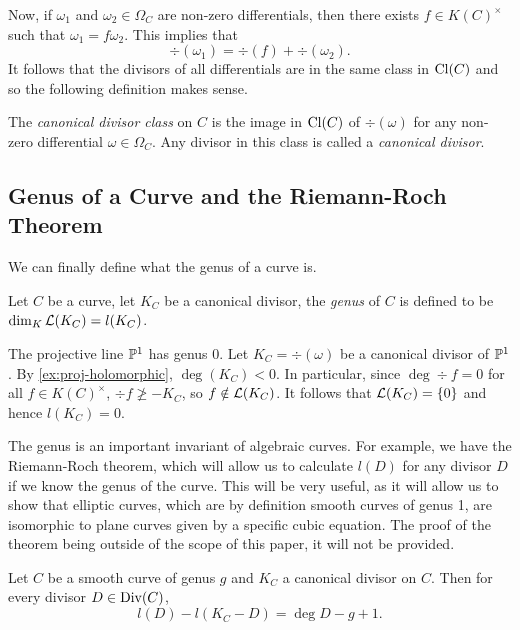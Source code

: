 Now, if $\omega_1$ and $\omega_2 \in \Omega_C$ are non-zero differentials, then
there exists $f\in K(C)^\times$ such that $\omega_1 = f\omega_2$.
This implies that
\begin{equation*}
	\div(\omega_1) = \div(f) + \div(\omega_2).
\end{equation*}
It follows that the divisors of all differentials are in the same class in
$\operatorname{Cl}(C)$ and so the following definition makes sense.

\begin{definition}
	The \emph{canonical divisor class} on $C$ is the image in $\operatorname{Cl}(C)$ of
	$\div(\omega)$ for any non-zero differential $\omega \in \Omega_C$.
	Any divisor in this class is called a \emph{canonical divisor}.
\end{definition}

\subsection{Genus of a Curve and the Riemann-Roch Theorem}

We can finally define what the genus of a curve is.
\begin{definition}
	Let $C$ be a curve, let $K_C$ be a canonical divisor,
	the \emph{genus} of $C$ is defined to be $\dim_K \mathcal{L}(K_C) = l(K_C)$.
\end{definition}

\begin{example}
	\label{ex:proj-genus}
	The projective line $\mathbb{P}^1$ has genus 0.
	Let $K_C = \div(\omega)$ be a canonical divisor of $\mathbb{P}^1$.
	By \ref{ex:proj-holomorphic}, $\deg(K_C) < 0$. In particular, 
	since $\deg \div f = 0$ for all $f \in K(C)^\times$,
	$\div f \not\geq -K_C$,
	so $f \notin \mathcal{L}(K_C)$. It follows that $\mathcal{L}(K_C) = \{0\}$ and
	hence $l(K_C) = 0$.
\end{example}

The genus is an important invariant  of algebraic curves.
For example, we have the Riemann-Roch theorem, which will
allow us to calculate $l(D)$ for any divisor $D$ if we know the genus of
the curve.
This will be very useful, as it will allow us to show that elliptic curves,
which are by definition smooth curves of genus 1, are
isomorphic to plane curves given by a specific cubic equation.
The proof of the theorem
being outside of the scope of this paper, it will not be provided.
\begin{theorem}
	\label{thm:riemann-roch}
	Let $C$ be a smooth curve of genus $g$ and $K_C$ a canonical divisor on $C$.
	Then for every divisor $D \in \operatorname{Div}(C)$,
	\begin{equation*}
		l(D) - l(K_C - D) = \deg D - g + 1.
	\end{equation*}
\end{theorem}

